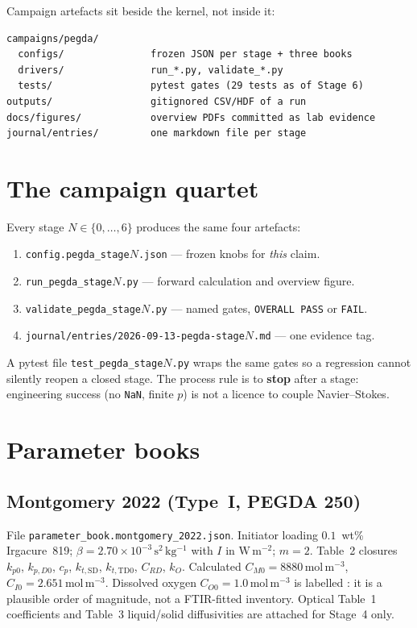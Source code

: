 Campaign artefacts sit beside the kernel, not inside it:

\begin{verbatim}
campaigns/pegda/
  configs/               frozen JSON per stage + three books
  drivers/               run_*.py, validate_*.py
  tests/                 pytest gates (29 tests as of Stage 6)
outputs/                 gitignored CSV/HDF of a run
docs/figures/            overview PDFs committed as lab evidence
journal/entries/         one markdown file per stage
\end{verbatim}

\section{The campaign quartet}

Every stage $N\in\{0,\ldots,6\}$ produces the same four artefacts:

\begin{enumerate}
  \item \texttt{config.pegda\_stage$N$.json} --- frozen knobs for \emph{this} claim.
  \item \texttt{run\_pegda\_stage$N$.py} --- forward calculation and overview figure.
  \item \texttt{validate\_pegda\_stage$N$.py} --- named gates, \texttt{OVERALL PASS} or \texttt{FAIL}.
  \item \texttt{journal/entries/2026-09-13-pegda-stage$N$.md} --- one evidence tag.
\end{enumerate}

A pytest file \texttt{test\_pegda\_stage$N$.py} wraps the same gates so a regression cannot silently reopen a closed stage.
The process rule is to \textbf{stop} after a stage: engineering success (no \texttt{NaN}, finite $p$) is not a licence to couple Navier--Stokes.

\section{Parameter books}

\subsection{Montgomery 2022 (Type~I, PEGDA 250)}

File \texttt{parameter\_book.montgomery\_2022.json}.
Initiator loading $0.1$~wt\% Irgacure~819; $\beta=2.70\times10^{-3}\,\mathrm{s^2\,kg^{-1}}$ with $I$ in $\mathrm{W\,m^{-2}}$; $m=2$.
Table~2 closures $k_{p0}$, $k_{p,D0}$, $c_p$, $k_{t,\mathrm{SD}}$, $k_{t,\mathrm{TD0}}$, $C_{RD}$, $k_O$.
Calculated $C_{M0}=8880\,\mathrm{mol\,m^{-3}}$, $C_{I0}=2.651\,\mathrm{mol\,m^{-3}}$.
Dissolved oxygen $C_{O0}=1.0\,\mathrm{mol\,m^{-3}}$ is labelled \stillreq{}: it is a plausible order of magnitude, not a FTIR-fitted inventory.
Optical Table~1 coefficients and Table~3 liquid/solid diffusivities are attached for Stage~4 only.

